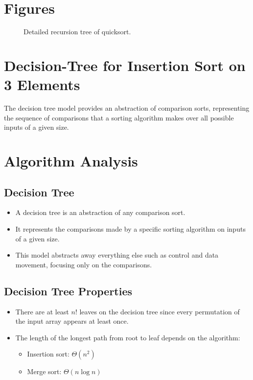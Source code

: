\documentclass[12pt,openany]{book}
\theoremstyle{definition}
\begin{document}
\section{Figures}
\begin{figure}[htp]
	\centering
	\caption{Detailed recursion tree of quicksort.}
\end{figure}

\section{Decision-Tree for Insertion Sort on 3 Elements}

The decision tree model provides an abstraction of comparison sorts, representing the sequence of comparisons that a sorting algorithm makes over all possible inputs of a given size.

\section{Algorithm Analysis}

\subsection{Decision Tree}
\begin{itemize}
	\item A decision tree is an abstraction of any comparison sort.
	\item It represents the comparisons made by a specific sorting algorithm on inputs of a given size.
	\item This model abstracts away everything else such as control and data movement, focusing only on the comparisons.
\end{itemize}

\subsection{Decision Tree Properties}
\begin{itemize}
	\item There are at least \( n! \) leaves on the decision tree since every permutation of the input array appears at least once.
	\item The length of the longest path from root to leaf depends on the algorithm:
	\begin{itemize}
		\item Insertion sort: \( \Theta(n^2) \)
		\item Merge sort: \( \Theta(n \log n) \)
	\end{itemize}
\end{itemize}
\end{document}

